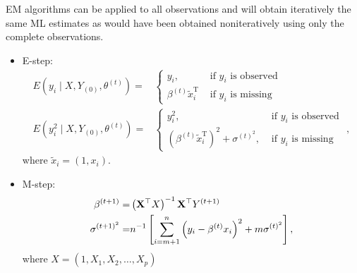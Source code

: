 \begin{example}
	EM algorithms can be applied to all observations and will obtain iteratively the same ML estimates as would have been obtained noniteratively using only the complete observations.

	\begin{itemize}
		\item E-step:
		      \begin{equation}
			      \begin{aligned}
				      E\left(y_{i} \mid X, Y_{(0)}, \theta^{(t)}\right)=     & \left\{\begin{array}{ll}
					                                                                      y_{i},                                 & \text { if } y_{i} \text { is observed } \\
					                                                                      \beta^{(t)} \tilde{x}_{i}^{\mathrm{T}} & \text { if } y_{i} \text { is missing }
				                                                                      \end{array}\right.                                                                                                             \\
				      E\left(y_{i}^{2} \mid X, Y_{(0)}, \theta^{(t)}\right)= & \left\{\begin{array}{ll}
					                                                                      y_{i}^{2},                                                                & \text { if } y_{i} \text { is observed } \\
					                                                                      \left(\beta^{(t)} \tilde{x}_{i}^{\mathrm{T}}\right)^{2}+\sigma^{(t)^{2}}, & \text { if } y_{i} \text { is missing }
				                                                                      \end{array}\right.,
			      \end{aligned}
		      \end{equation}
		      where $\tilde{x}_{i}=(1,x_{i})$.
		\item M-step:
		      \begin{equation}
			      \begin{aligned}
				      \beta^{(t+1)}=      & \left({\bf X}^{\top} X\right)^{-1} {\bf X}^{\top} Y^{(t+1)}                                           \\
				      \sigma^{(t+1)^{2}}= & n^{-1}\left[\sum_{i=m+1}^{n}\left(y_{i}-\beta^{(t)} x_{i}\right)^{2}+m \sigma^{(t)^{2}}\right],
			      \end{aligned}
		      \end{equation}
		      where $X=(1,X_1,X_2,\ldots,X_p)$
	\end{itemize}
\end{example}

